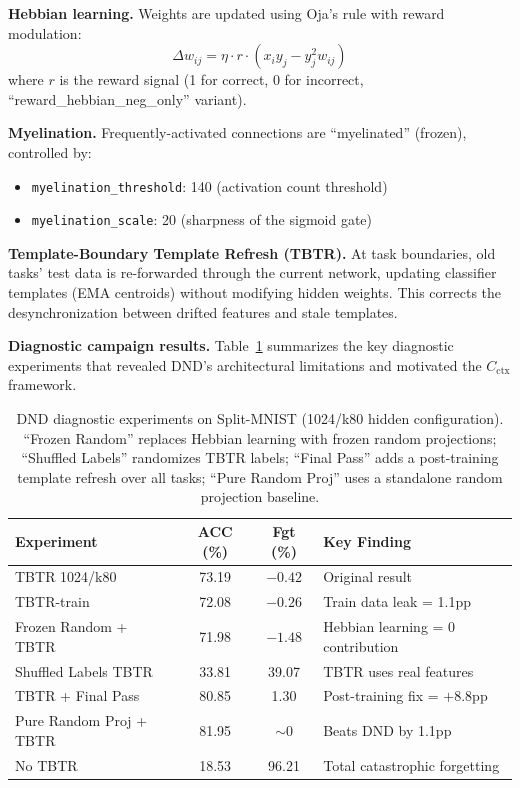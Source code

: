 \documentclass{article}
\begin{document}
\textbf{Hebbian learning.}
Weights are updated using Oja's rule with reward modulation:
\begin{equation}
    \Delta w_{ij} = \eta \cdot r \cdot \left(x_i y_j - y_j^2 w_{ij}\right)
\end{equation}
where $r$ is the reward signal (1 for correct, 0 for incorrect, ``reward\_hebbian\_neg\_only'' variant).

\textbf{Myelination.}
Frequently-activated connections are ``myelinated'' (frozen), controlled by:
\begin{itemize}
    \item \texttt{myelination\_threshold}: 140 (activation count threshold)
    \item \texttt{myelination\_scale}: 20 (sharpness of the sigmoid gate)
\end{itemize}

\textbf{Template-Boundary Template Refresh (TBTR).}
At task boundaries, old tasks' test data is re-forwarded through the current network, updating classifier templates (EMA centroids) without modifying hidden weights. This corrects the desynchronization between drifted features and stale templates.

\textbf{Diagnostic campaign results.}
Table~\ref{tab:dnd_diag} summarizes the key diagnostic experiments that revealed DND's architectural limitations and motivated the $C_\mathrm{ctx}$ framework.

\begin{table}[h]
\centering
\caption{DND diagnostic experiments on Split-MNIST (1024/k80 hidden configuration). ``Frozen Random'' replaces Hebbian learning with frozen random projections; ``Shuffled Labels'' randomizes TBTR labels; ``Final Pass'' adds a post-training template refresh over all tasks; ``Pure Random Proj'' uses a standalone random projection baseline.}
\label{tab:dnd_diag}
\small
\begin{tabular}{lccl}
\toprule
Experiment & ACC (\%) & Fgt (\%) & Key Finding \\
\midrule
TBTR 1024/k80                & 73.19 & $-0.42$ & Original result \\
TBTR-train                   & 72.08 & $-0.26$ & Train data leak = 1.1pp \\
Frozen Random + TBTR         & 71.98 & $-1.48$ & Hebbian learning = 0 contribution \\
Shuffled Labels TBTR         & 33.81 & 39.07  & TBTR uses real features \\
TBTR + Final Pass            & 80.85 & 1.30   & Post-training fix = $+$8.8pp \\
Pure Random Proj + TBTR      & 81.95 & $\sim$0 & Beats DND by 1.1pp \\
No TBTR                      & 18.53 & 96.21  & Total catastrophic forgetting \\
\bottomrule
\end{tabular}
\end{table}
\end{document}
